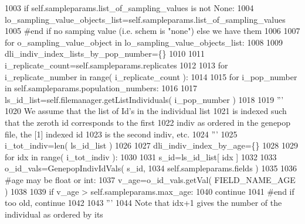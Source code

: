 \begin{DoxyCode}
1003         \textcolor{keywordflow}{if} self.sampleparams.list\_of\_sampling\_values \textcolor{keywordflow}{is} \textcolor{keywordflow}{not} \textcolor{keywordtype}{None}:
1004             lo\_sampling\_value\_objects\_list=self.sampleparams.list\_of\_sampling\_values
1005         \textcolor{comment}{#end if no samping value (i.e. schem is "none") else we have them}
1006 
1007         \textcolor{keywordflow}{for} o\_sampling\_value\_object \textcolor{keywordflow}{in} lo\_sampling\_value\_objects\_list:
1008             
1009             dli\_indiv\_index\_lists\_by\_pop\_number=\{\}
1010             
1011             i\_replicate\_count=self.sampleparams.replicates
1012 
1013             \textcolor{keywordflow}{for} i\_replicate\_number \textcolor{keywordflow}{in} range( i\_replicate\_count ):
1014 
1015                 \textcolor{keywordflow}{for} i\_pop\_number \textcolor{keywordflow}{in} self.sampleparams.population\_numbers:
1016 
1017                     ls\_id\_list=self.filemanager.getListIndividuals( i\_pop\_number )
1018 
1019                     \textcolor{stringliteral}{'''}
1020 \textcolor{stringliteral}{                    We assume that the list of Id's in the individual list}
1021 \textcolor{stringliteral}{                    is indexed such that the zeroth id corresponds to the first}
1022 \textcolor{stringliteral}{                    indiv as ordered in the genepop file, the [1] indexed id}
1023 \textcolor{stringliteral}{                    is the second indiv, etc.}
1024 \textcolor{stringliteral}{                    '''}
1025                     i\_tot\_indiv=len( ls\_id\_list )
1026 
1027                     dli\_indiv\_index\_by\_age=\{\}
1028                     
1029                     \textcolor{keywordflow}{for} idx \textcolor{keywordflow}{in} range( i\_tot\_indiv ):
1030 
1031                         s\_id=ls\_id\_list[ idx ]
1032 
1033                         o\_id\_vals=GenepopIndivIdVals( s\_id, 
1034                                             self.sampleparams.fields )
1035                         
1036                         \textcolor{comment}{#age may be float or int:}
1037                         v\_age=o\_id\_vals.getVal( FIELD\_NAME\_AGE )
1038 
1039                         \textcolor{keywordflow}{if} v\_age > self.sampleparams.max\_age:
1040                             \textcolor{keywordflow}{continue}
1041                         \textcolor{comment}{#end if too old, continue}
1042 
1043                         \textcolor{stringliteral}{'''}
1044 \textcolor{stringliteral}{                        Note that idx+1 gives the number of the individual as ordered by its}

\end{DoxyCode}
